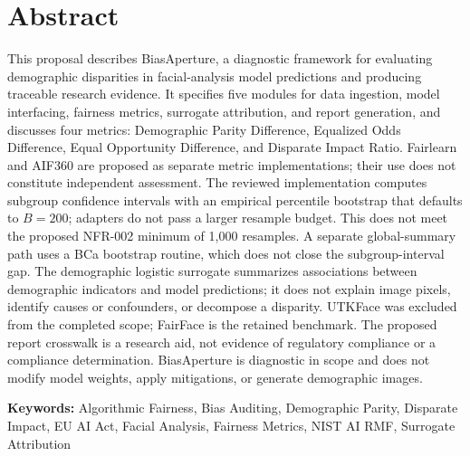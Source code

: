 \chapter*{Abstract}

This proposal describes BiasAperture, a diagnostic framework for evaluating demographic disparities in facial-analysis model predictions and producing traceable research evidence. It specifies five modules for data ingestion, model interfacing, fairness metrics, surrogate attribution, and report generation, and discusses four metrics: Demographic Parity Difference, Equalized Odds Difference, Equal Opportunity Difference, and Disparate Impact Ratio. Fairlearn and AIF360 are proposed as separate metric implementations; their use does not constitute independent assessment. The reviewed implementation computes subgroup confidence intervals with an empirical percentile bootstrap that defaults to $B=200$; adapters do not pass a larger resample budget. This does not meet the proposed NFR-002 minimum of 1{,}000 resamples. A separate global-summary path uses a BCa bootstrap routine, which does not close the subgroup-interval gap. The demographic logistic surrogate summarizes associations between demographic indicators and model predictions; it does not explain image pixels, identify causes or confounders, or decompose a disparity. UTKFace was excluded from the completed scope; FairFace is the retained benchmark. The proposed report crosswalk is a research aid, not evidence of regulatory compliance or a compliance determination. BiasAperture is diagnostic in scope and does not modify model weights, apply mitigations, or generate demographic images.

\vspace{1cm}
\noindent
\textbf{Keywords:} Algorithmic Fairness, Bias Auditing, Demographic Parity, Disparate Impact, EU AI Act, Facial Analysis, Fairness Metrics, NIST AI RMF, Surrogate Attribution
